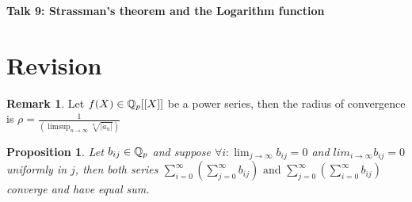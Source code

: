 \documentclass{article}
\theoremstyle{plain}
\newtheorem{prop}[thm]{Proposition}
\theoremstyle{definition}
\newtheorem{rem}[thm]{Remark}
\begin{document}
\pagestyle{fancy}
\renewcommand{\footrulewidth}{0.4pt}
\fancyhead{}
\fancyfoot{}
\begin{center}
	\Huge{\textbf{Talk 9: Strassman's theorem and the Logarithm function}}%
\end{center}
	\begin{minipage}[t]{0.49\textwidth}%
		\section{Revision}
		\begin{rem}\cite[Prop. 5.4.1]{Gou}
		Let $f(X) \in \Bbb Q_{p}[[X]]$ be a power series, then the radius of convergence is
		$\rho = \frac 1{(\limsup_{n \to \infty}\sqrt[n]{|a_{n}|})}$
		\end{rem}
		\begin{prop}{\cite[Prop. 5.1.4]{Gou}}
		Let $b_{ij} \in \Bbb Q_{p}$ and suppose $\forall i: \lim_{j \to \infty}b_{ij} = 0$ and $lim_{i \to \infty}b_{ij} = 0$ uniformly in $j$, then both series
		$\sum_{i=0}^{\infty}\left(\sum_{j=0}^{\infty} b_{ij} \right) \text{ and } \sum_{j=0}^{\infty}\left(\sum_{i=0}^{\infty} b_{ij} \right)$
		converge and have equal sum.
		\end{prop}

\end{minipage}
\end{document}
